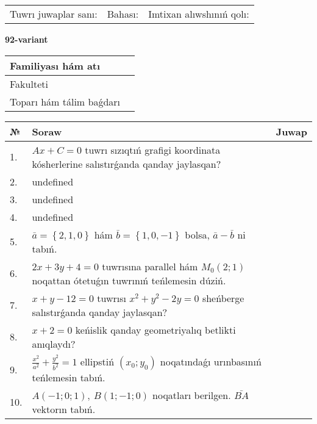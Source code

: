\documentclass{article}
\begin{document}
\vspace{0.7cm}

\begin{tabular}{lll}
Tuwrı juwaplar sanı: \underline{\hspace{1cm}} & 
Bahası: \underline{\hspace{1cm}} & 
Imtixan alıwshınıń qolı: \underline{\hspace{2cm}} \\
\end{tabular}

\egroup

\newpage


\textbf{92-variant}\\

\bgroup
\def\arraystretch{1.6} %

\begin{tabular}{|m{5.7cm}|m{9.5cm}|}
\hline
Familiyası hám atı & \\
\hline
Fakulteti  & \\
\hline
Toparı hám tálim baǵdarı  & \\
\hline
\end{tabular}

\vspace{0.7cm}

\begin{tabular}{|m{0.7cm}|m{10cm}|m{4cm}|}
\hline
№ & Soraw & Juwap \\
\hline
1. & \(Ax + C = 0\) tuwrı sızıqtıń grafigi koordinata kósherlerine salıstırǵanda qanday jaylasqan? &  \\
\hline
2. & undefined &  \\
\hline
3. & undefined &  \\
\hline
4. & undefined &  \\
\hline
5. & \(\bar{a} = \left\{ 2, 1, 0 \right\}\) hám \(\bar{b} = \left\{ 1, 0,- 1 \right\}\) bolsa, \(\bar{a} - \bar{b}\) ni tabıń. &  \\
\hline
6. & \(2 x + 3 y + 4 = 0\) tuwrısına parallel hám \(M_{0} (2;1)\) noqattan ótetuǵın tuwrınıń teńlemesin dúziń. &  \\
\hline
7. & \(x + y - 12 = 0\) tuwrısı \(x^{2} + y^{2} - 2 y = 0\) sheńberge salıstırǵanda qanday jaylasqan? &  \\
\hline
8. & \(x + 2 = 0\) keńislik qanday geometriyalıq betlikti anıqlaydı? &  \\
\hline
9. & \(\frac{x^{2}}{a^{2}} + \frac{y^{2}}{b^{2}} = 1\) ellipstiń \((x_{0};y_{0})\) noqatındaǵı urınbasınıń teńlemesin tabıń. &  \\
\hline
10. & \(A (- 1;0;1),\ B (1; - 1;0)\) noqatları berilgen. \(\bar{BA}\) vektorın tabıń. & \\
\hline
\end{tabular}
\end{document}
